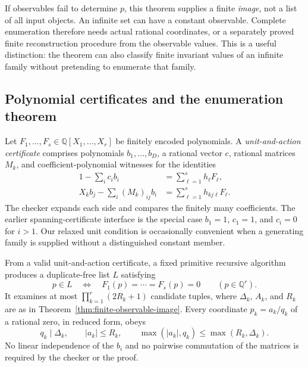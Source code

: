 If observables fail to determine $p$, this theorem supplies a finite
\emph{image}, not a list of all input objects.  An infinite set can
have a constant observable.  Complete enumeration therefore needs
actual rational coordinates, or a separately proved finite reconstruction
procedure from the observable values.  This is a useful distinction:
the theorem can also classify finite invariant values of an infinite
family without pretending to enumerate that family.

\subsection{Polynomial certificates and the enumeration theorem}

Let $F_1,\ldots,F_s\in\mathbb Q[X_1,\ldots,X_r]$ be finitely
encoded polynomials.  A \emph{unit-and-action certificate} comprises
polynomials $b_1,\ldots,b_D$, a rational vector $c$, rational
matrices $M_k$, and coefficient-polynomial witnesses for the identities
\begin{align}
 1-\sum_i c_i b_i&=\sum_{\ell=1}^s h_\ell F_\ell,
                \label{eq:module-unit-certificate}\\
 X_kb_j-\sum_i (M_k)_{ij}b_i
       &=\sum_{\ell=1}^s h_{kj\ell}F_\ell.
                \label{eq:module-action-certificate}
\end{align}
The checker expands each side and compares the finitely many
coefficients.  The earlier spanning-certificate interface is the
special case $b_1=1$, $c_1=1$, and $c_i=0$ for $i>1$.
Our relaxed unit condition is occasionally convenient when a generating
family is supplied without a distinguished constant member.

\begin{theorem}
\label{thm:module-enumeration}
From a valid unit-and-action certificate, a fixed primitive recursive
algorithm produces a duplicate-free list $L$ satisfying
\[
  p\in L\quad\Longleftrightarrow\quad
           F_1(p)=\cdots=F_s(p)=0
       \qquad(p\in\mathbb Q^r).
\]
It examines at most $\prod_{k=1}^r(2R_k+1)$ candidate tuples,
where $\Delta_k$, $A_k$, and $R_k$ are as in
Theorem~\ref{thm:finite-observable-image}.  Every coordinate
$p_k=a_k/q_k$ of a rational zero, in reduced form, obeys
\[
 q_k\mid\Delta_k,
 \qquad |a_k|\le R_k,
 \qquad \max(|a_k|,q_k)\le\max(R_k,\Delta_k).
\]
No linear independence of the $b_i$ and no pairwise commutation of
the matrices is required by the checker or the proof.
\end{theorem}

